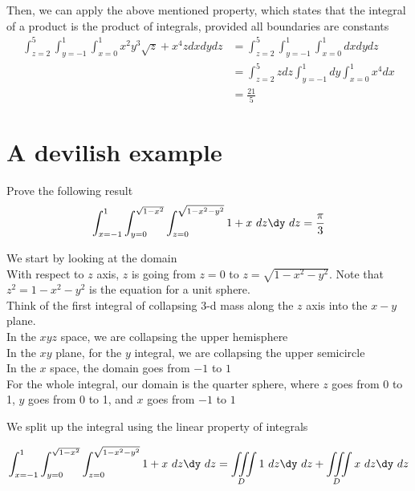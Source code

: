 Then, we can apply the above mentioned property, which states that the integral of a product is the product of integrals, provided all boundaries are constants \\


\begin{align*}
   \int_{z = 2}^{5} \int_{y=-1}^{1} \int_{x=0}^{1} x^2 y^3 \sqrt{z} + x^4 z dx dy dz &= \int_{z = 2}^{5} \int_{y=-1}^{1} \int_{x=0}^{1} dx dy dz \\
                                                                                     &= \int_{z=2}^{5}z dz \int_{y=-1}^{1} dy \int_{x=0}^{1} x^4 dx \\
                                                                                     &= \frac{21}{5}
\end{align*}


\section{A devilish example}

Prove the following result
\[
   \int_{x=-1}^{1} \int_{y=0}^{\sqrt{1-x^2}} \int_{z=0}^{\sqrt{1-x^2 - y^2}}  1+ x \ dz \dy\ dz = \frac{\pi}{3}
\] 

We start by looking at the domain \\

With respect to $z$ axis, $z$ is going from $z = 0$ to $z = \sqrt{1 - x^2 - y^2}$. Note that  $z^2 = 1 - x^2 - y^2$ is the equation for a unit sphere. \\

Think of the first integral of collapsing 3-d mass along the $z$ axis into the $x-y$ plane. \\

In the $xyz$ space, we are collapsing the upper hemisphere \\

In the $xy$ plane, for the $y$ integral, we are collapsing the upper semicircle \\

In the $x$ space, the domain goes from $-1 $ to $1$ \\

For the whole integral, our domain is the quarter sphere, where $z$ goes from 0 to 1, $y$ goes from 0 to 1, and $x$ goes from $-1$ to $1$

We split up the integral using the linear property of integrals

\[
   \int_{x=-1}^{1} \int_{y=0}^{\sqrt{1-x^2}} \int_{z=0}^{\sqrt{1-x^2 - y^2}}  1+ x \ dz \dy\ dz =
   \iiint \limits_{D}^{}  1 \ dz \dy\ dz + 
   \iiint \limits_{D}^{}  x \ dz \dy\ dz 
\] 

